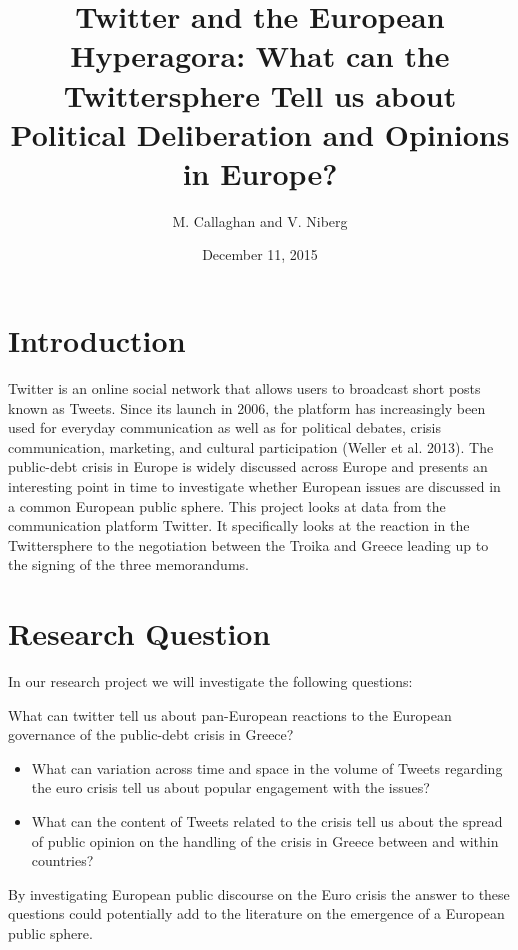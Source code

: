 \documentclass[]{article}
\title{Twitter and the European Hyperagora: What can the Twittersphere Tell us
about Political Deliberation and Opinions in Europe?}
\author{M. Callaghan and V. Niberg}
\date{December 11, 2015}
\begin{document}
\maketitle


{
\hypersetup{linkcolor=black}
\setcounter{tocdepth}{2}
\tableofcontents
}
\newpage

\section{Introduction}\label{introduction}

Twitter is an online social network that allows users to broadcast short
posts known as Tweets. Since its launch in 2006, the platform has
increasingly been used for everyday communication as well as for
political debates, crisis communication, marketing, and cultural
participation (Weller et al. 2013). The public-debt crisis in Europe is
widely discussed across Europe and presents an interesting point in time
to investigate whether European issues are discussed in a common
European public sphere. This project looks at data from the
communication platform Twitter. It specifically looks at the reaction in
the Twittersphere to the negotiation between the Troika and Greece
leading up to the signing of the three memorandums.

\section{Research Question}\label{research-question}

In our research project we will investigate the following questions:

What can twitter tell us about pan-European reactions to the European
governance of the public-debt crisis in Greece?

\begin{itemize}
\item
  What can variation across time and space in the volume of Tweets
  regarding the euro crisis tell us about popular engagement with the
  issues?
\item
  What can the content of Tweets related to the crisis tell us about the
  spread of public opinion on the handling of the crisis in Greece
  between and within countries?
\end{itemize}

By investigating European public discourse on the Euro crisis the answer
to these questions could potentially add to the literature on the
emergence of a European public sphere.
\end{document}
